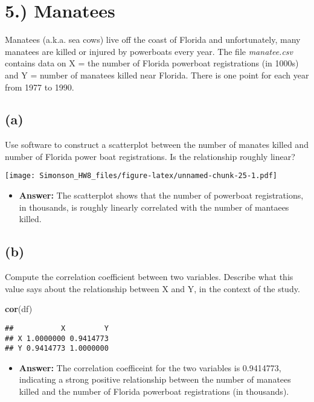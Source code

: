 \documentclass[]{article}
\newenvironment{Shaded}{\begin{snugshade}}{\end{snugshade}}
\newcommand{\KeywordTok}[1]{\textcolor[rgb]{0.13,0.29,0.53}{\textbf{#1}}}
\newcommand{\NormalTok}[1]{#1}
\providecommand{\tightlist}{%
  \setlength{\itemsep}{0pt}\setlength{\parskip}{0pt}}
\begin{document}
\section{5.) Manatees}\label{manatees}

Manatees (a.k.a. sea cows) live off the coast of Florida and
unfortunately, many manatees are killed or injured by powerboats every
year. The file \emph{manatee.csv} contains data on X = the number of
Florida powerboat registrations (in 1000s) and Y = number of manatees
killed near Florida. There is one point for each year from 1977 to 1990.

\subsection{(a)}\label{a-4}

Use software to construct a scatterplot between the number of manates
killed and number of Florida power boat registrations. Is the
relationship roughly linear?

\texttt{[image: Simonson\_HW8\_files/figure-latex/unnamed-chunk-25-1.pdf]}

\begin{itemize}
\tightlist
\item
  \textbf{Answer:} The scatterplot shows that the number of powerboat
  registrations, in thousands, is roughly linearly correlated with the
  number of mantaees killed.
\end{itemize}

\subsection{(b)}\label{b-4}

Compute the correlation coefficient between two variables. Describe what
this value says about the relationship between X and Y, in the context
of the study.

\begin{Shaded}
\begin{Highlighting}[]
\KeywordTok{cor}\NormalTok{(df)}
\end{Highlighting}
\end{Shaded}

\begin{verbatim}
##           X         Y
## X 1.0000000 0.9414773
## Y 0.9414773 1.0000000
\end{verbatim}

\begin{itemize}
\tightlist
\item
  \textbf{Answer:} The correlation coefficeint for the two variables is
  0.9414773, indicating a strong positive relationship between the
  number of manatees killed and the number of Florida powerboat
  registrations (in thousands).
\end{itemize}
\end{document}
